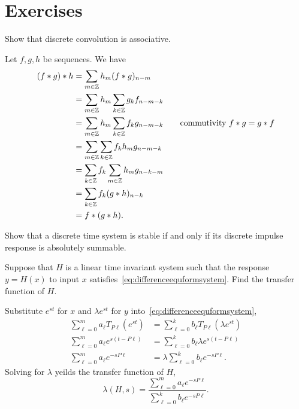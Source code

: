 \begin{comment}

\section{Digital filters}\label{sec:digital-filters}


\end{comment}


\section{Exercises}

\begin{excersizelist}


\item \label{excer:discrconvassociative} Show that discrete convolution is associative.
\begin{solution}
Let $f,g,h$ be sequences.  We have
\begin{align*}
(f*g)*h &= \sum_{m \in {\mathbb Z}} h_{m} (f*g)_{n-m} \\
&= \sum_{m \in {\mathbb Z}} h_{m} \sum_{k \in {\mathbb Z}} g_{k} f_{n-m-k} \\
&= \sum_{m \in {\mathbb Z}} h_{m} \sum_{k \in {\mathbb Z}} f_{k} g_{n-m-k} \qquad \text{commutivity $f*g=g*f$} \\
&= \sum_{m \in {\mathbb Z}} \sum_{k \in {\mathbb Z}} f_{k} h_m g_{n-m-k} \\
&= \sum_{k \in {\mathbb Z}} f_{k} \sum_{m \in {\mathbb Z}}  h_m g_{n-k-m} \\
&= \sum_{k \in {\mathbb Z}} f_{k} (g*h)_{n-k} \\
&= f*(g*h).
\end{align*}
\end{solution}

\item \label{excer:stableimpulserespdiscretetime} Show that a discrete time system is stable if and only if its discrete impulse response is absolutely summable. 

\item \label{exer:findtransfuncdiffeq} Suppose that $H$ is a linear time invariant system such that the response $y = H(x)$ to input $x$ satisfies~\eqref{eq:differenceequformsystem}.  Find the transfer function of $H$.
\begin{solution}
Substitute $e^{st}$ for $x$ and $\lambda e^{st}$ for $y$ into~\eqref{eq:differenceequformsystem},
\begin{align*}
\sum_{\ell=0}^{m} a_\ell T_{P\ell}(e^{st}) &= \sum_{\ell=0}^{k} b_\ell T_{P\ell}(\lambda e^{st}) \\
\sum_{\ell=0}^{m} a_\ell e^{s(t-P\ell)} &= \sum_{\ell=0}^{k} b_\ell \lambda e^{s(t-P\ell)} \\
\sum_{\ell=0}^{m} a_\ell e^{-sP\ell} &= \lambda \sum_{\ell=0}^{k} b_\ell e^{-sP\ell}.
\end{align*}
Solving for $\lambda$ yeilds the transfer function of $H$,
\[
\lambda(H,s) = \frac{\sum_{\ell=0}^{m} a_\ell e^{-sP\ell}}{\sum_{\ell=0}^{k} b_\ell e^{-sP\ell}}.
\]
\end{solution}


\end{excersizelist}
